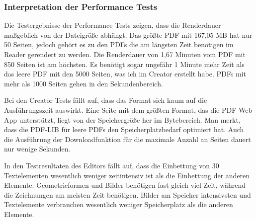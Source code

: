 \subsubsection{Interpretation der Performance Tests}
Die Testergebnisse der Performance Tests zeigen, dass die Renderdauer maßgeblich von der Dateigröße abhängt. Das größte PDF mit 167,05 MB hat nur 50 Seiten, jedoch gehört es zu den PDFs die am längsten Zeit benötigen im Reader gerendert zu werden. Die Renderdauer von 1,67 Minuten vom PDF mit 850 Seiten ist am höchsten. Es benötigt sogar ungefähr 1 Minute mehr Zeit als das leere PDF mit den 5000 Seiten, was ich im Creator erstellt habe. PDFs mit mehr als 1000 Seiten gehen in den Sekundenbereich.
\par 
Bei den Creator Tests fällt auf, dass das Format sich kaum auf die Ausführungszeit auswirkt. Eine Seite mit dem größten Format, das die PDF Web App unterstützt, liegt von der Speichergröße her im Bytebereich. Man merkt, dass die PDF-LIB für leere PDFs den Speicherplatzbedarf optimiert hat. Auch die Ausführung der Downloadfunktion für die maximale Anzahl an Seiten dauert nur wenige Sekunden. 
\par
In den Testresultaten des Editors fällt auf, dass die Einbettung von 30 Textelementen wesentlich weniger zeitintensiv ist als die Einbettung der anderen Elemente. Geometrieformen und Bilder benötigen fast gleich viel Zeit, während die Zeichnungen am meisten Zeit benötigen. Bilder am Speicher intensivsten und Textelemente verbrauchen wesentlich weniger Speicherplatz als die anderen Elemente.  

